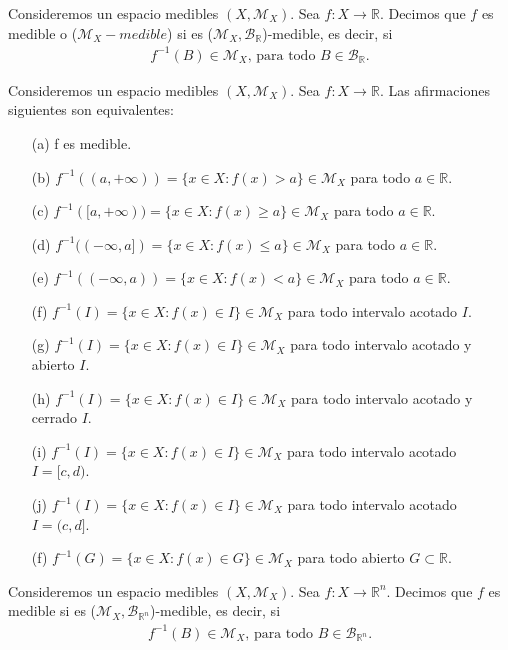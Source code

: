  \begin{defi}
 Consideremos un espacio medibles $(X, \mathcal{M}_X)$. Sea $f : X \longrightarrow \mathbb{R}$. Decimos que $f$ es medible o ($\mathcal{M}_X - medible$) si es ($\mathcal{M}_X, \mathcal{B}_{\mathbb{R}}$)-medible, es decir, si
 \begin{align*}
     f^{-1}(B) \in \mathcal{M}_X \text{, para todo } B \in \mathcal{B}_{\mathbb{R}}.
 \end{align*}
 \end{defi}
 \begin{prop}
 Consideremos un espacio medibles $(X, \mathcal{M}_X)$. Sea $f : X \longrightarrow \mathbb{R}$. Las afirmaciones siguientes son equivalentes:
 \begin{enumerate}
     \item[(a)] f es medible.
     \item[(b)] $f^{-1}((a, +\infty)) = \{ x \in X : f(x) > a\} \in \mathcal{M}_X$ para todo $a \in \mathbb{R}$.
     \item[(c)] $f^{-1}([a, +\infty)) = \{ x \in X : f(x) \ge a\} \in \mathcal{M}_X$ para todo $a \in \mathbb{R}$.
     \item[(d)] $f^{-1}((-\infty,a]) = \{ x \in X : f(x) \leq a\} \in \mathcal{M}_X$ para todo $a \in \mathbb{R}$.
     \item[(e)] $f^{-1}((-\infty,a)) = \{ x \in X : f(x) < a\} \in \mathcal{M}_X$ para todo $a \in \mathbb{R}$.
     \item[(f)] $f^{-1}(I) = \{ x \in X : f(x) \in I \} \in \mathcal{M}_X$ para todo intervalo acotado $I$.
     \item[(g)] $f^{-1}(I) = \{ x \in X : f(x) \in I \} \in \mathcal{M}_X$ para todo intervalo acotado y abierto $I$.
     \item[(h)] $f^{-1}(I) = \{ x \in X : f(x) \in I \} \in \mathcal{M}_X$ para todo intervalo acotado y cerrado $I$.
     \item[(i)] $f^{-1}(I) = \{ x \in X : f(x) \in I \} \in \mathcal{M}_X$ para todo intervalo acotado $I = [c,d)$.
     \item[(j)] $f^{-1}(I) = \{ x \in X : f(x) \in I \} \in \mathcal{M}_X$ para todo intervalo acotado $I = (c,d]$.
     \item[(f)] $f^{-1}(G) = \{ x \in X : f(x) \in G \} \in \mathcal{M}_X$ para todo abierto $G \subset \mathbb{R}$.
 \end{enumerate}
 \end{prop}
 
\begin{defi}
 Consideremos un espacio medibles $(X, \mathcal{M}_X)$. Sea $f : X \longrightarrow \mathbb{R}^n$. Decimos que $f$ es medible si es ($\mathcal{M}_X, \mathcal{B}_{\mathbb{R}^n}$)-medible, es decir, si
\begin{align*}
     f^{-1}(B) \in \mathcal{M}_X \text{, para todo } B \in \mathcal{B}_{\mathbb{R}^n}.
\end{align*}
\end{defi}

